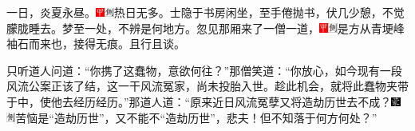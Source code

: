 一日，炎夏永昼。{\includegraphics[width=3mm]{../Images/00002}\includegraphics[width=3mm]{../Images/00011}\footnotesize 热日无多。}士隐于书房闲坐，至手倦抛书，伏几少憩，不觉朦胧睡去。梦至一处，不辨是何地方。忽见那厢来了一僧一道，{\includegraphics[width=3mm]{../Images/00002}\includegraphics[width=3mm]{../Images/00011}\footnotesize 是方从青埂峰袖石而来也，接得无痕。}且行且谈。

只听道人问道：``你携了这蠢物，意欲何往？''那僧笑道：``你放心，如今现有一段风流公案正该了结，这一干风流冤家，尚未投胎入世。趁此机会，就将此蠢物夹带于中，使他去经历经历。''那道人道：``原来近日风流冤孽又将造劫历世去不成？{\includegraphics[width=3mm]{../Images/00006}\includegraphics[width=3mm]{../Images/00011}\footnotesize 苦恼是``造劫历世''，又不能不``造劫历世''，悲夫！}但不知落于何方何处？''

